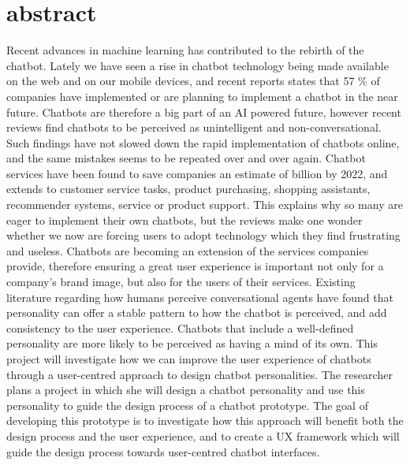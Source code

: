 \chapter*{abstract}

Recent advances in machine learning has contributed to the rebirth of the chatbot. Lately we have seen a rise in chatbot technology being made available on the web and on our mobile devices, and recent reports states that 57 \% of companies have implemented or are planning to implement a chatbot in the near future. Chatbots are therefore a big part of an AI powered future, however recent reviews find chatbots to be perceived as unintelligent and non-conversational. Such findings have not slowed down the rapid implementation of chatbots online, and the same mistakes seems to be repeated over and over again. Chatbot services have been found to save companies an estimate of  billion by 2022, and extends to customer service tasks, product purchasing, shopping assistants, recommender systems, service or product support. This explains why so many are eager to implement their own chatbots, but the reviews make one wonder whether we now are forcing users to adopt technology which they find frustrating and useless. Chatbots are becoming an extension of the services companies provide, therefore ensuring a great user experience is important not only for a company's brand image, but also for the users of their services. Existing literature regarding how humans perceive conversational agents have found that personality can offer a stable pattern to how the chatbot is perceived, and add consistency to the user experience. Chatbots that include a well-defined personality are more likely to be perceived as having a mind of its own. This project will investigate how we can improve the user experience of chatbots through a user-centred approach to design chatbot personalities. The researcher plans a project in which she will design a chatbot personality and use this personality to guide the design process of a chatbot prototype. The goal of developing this prototype is to investigate how this approach will benefit both the design process and the user experience, and to create a UX framework which will guide the design process towards user-centred chatbot interfaces.

\hypersetup{pageanchor=false}